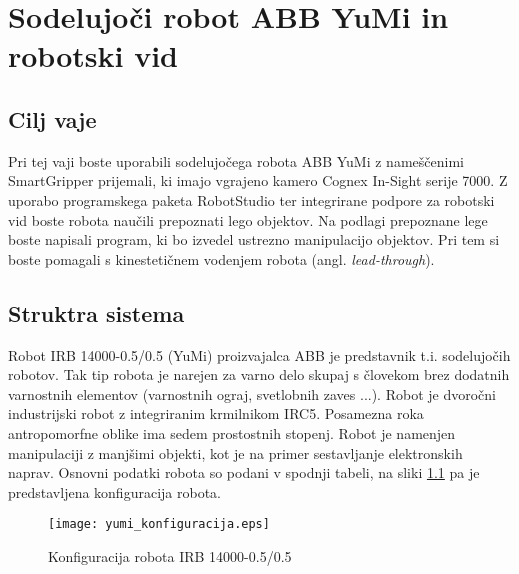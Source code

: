 \chapter{Sodelujoči robot ABB YuMi in robotski vid}%


\section{Cilj vaje}

Pri tej vaji boste uporabili sodelujočega robota ABB YuMi z nameščenimi SmartGripper prijemali, ki imajo vgrajeno kamero Cognex In-Sight serije 7000. Z uporabo programskega paketa RobotStudio ter integrirane podpore za robotski vid boste robota naučili prepoznati lego objektov. Na podlagi prepoznane lege boste napisali program, ki bo izvedel ustrezno manipulacijo objektov. Pri tem si boste pomagali s kinestetičnem vodenjem robota (angl. \emph{lead-through}).


\section{Struktra sistema}

Robot IRB 14000-0.5/0.5 (YuMi) proizvajalca ABB je predstavnik t.i. sodelujočih robotov. Tak tip robota je narejen za varno delo skupaj s človekom brez dodatnih varnostnih elementov (varnostnih ograj, svetlobnih zaves ...). Robot je dvoročni industrijski robot z integriranim krmilnikom IRC5. Posamezna roka antropomorfne oblike ima sedem prostostnih stopenj. Robot je namenjen manipulaciji z manjšimi objekti, kot je na primer sestavljanje elektronskih naprav. Osnovni podatki robota so podani v spodnji tabeli, na sliki \ref{fig:yumi_conf} pa je predstavljena konfiguracija robota.

\begin{figure}[!hbt]
\centering
\texttt{[image: yumi\_konfiguracija.eps]}
\caption{Konfiguracija robota IRB 14000-0.5/0.5}
\label{fig:yumi_conf}
\end{figure}


